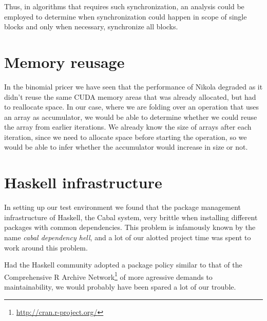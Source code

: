 Thus, in algorithms that requires such synchronization, an analysis
could be employed to determine when synchronization could happen in
scope of single blocks and only when necessary, synchronize all
blocks.

\section{Memory reusage}
In the binomial pricer we have seen that the performance of Nikola
degraded as it didn't reuse the same CUDA memory areas that was
already allocated, but had to reallocate space. In our case, where we
are folding over an operation that uses an array as accumulator, we
would be able to determine whether we could reuse the array from
earlier iterations. We already know the size of arrays after each
iteration, since we need to allocate space before starting the
operation, so we would be able to infer whether the accumulator would
increase in size or not.

\section{Haskell infrastructure}
\label{sec:haskell_infrastructure}

In setting up our test environment we found that the package management
infrastructure of Haskell, the Cabal system, very brittle when installing
different packages with common dependencies. This problem is infamously known
by the name \emph{cabal dependency hell}, and a lot of our alotted project time
was spent to work around this problem.

Had the Haskell community adopted a package policy similar to that of the
Comprehensive R Archive Network\footnote{\url{http://cran.r-project.org/}} of
more agressive demands to maintainability, we would probably have been spared a
lot of our trouble.

